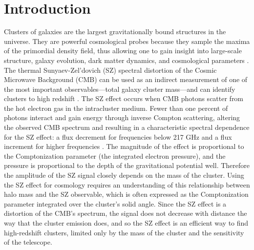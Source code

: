\documentclass[a4paper,fleqn,usenatbib]{mnras}
\begin{document}
\begin{keywords}

\end{keywords}




\section{Introduction}
Clusters of galaxies are the largest gravitationally bound structures in the universe. 
They are powerful cosmological probes because they sample the maxima of the primordial density field, thus allowing one to gain insight into large-scale structure, galaxy evolution, dark matter dynamics, and cosmological parameters \citep{2005RvMP...77..207V,2013SSRv..177..247G}. 
The thermal Sunyaev-Zel'dovich (SZ) spectral distortion of the Cosmic Microwave Background (CMB) \citep{1972CoASP...4..173S} can be used as an indirect measurement of one of the most important observables---total galaxy cluster mass---and can identify clusters to high redshift \citep{2002ARA&A..40..643C}. 
The SZ effect occurs when CMB photons scatter from the hot electron gas in the intracluster medium. 
Fewer than one percent of photons interact and gain energy through inverse Compton scattering, altering the observed CMB spectrum and resulting in a characteristic spectral dependence for the SZ effect: a flux decrement for frequencies below 217 GHz and a flux increment for higher frequencies \citep{1999PhR...310...97B,2002ARA&A..40..643C}.
The magnitude of the effect is proportional to the Comptonization parameter (the integrated electron pressure), and the pressure is proportional to the depth of the gravitational potential well.  Therefore the amplitude of the SZ signal closely depends on the mass of the cluster.
Using the SZ effect for cosmology requires an understanding of this relationship between halo mass and the SZ observable, which is often expressed as the Comptonization parameter integrated over the cluster's solid angle. 
Since the SZ effect is a distortion of the CMB's spectrum, the signal does not decrease with distance the way that the cluster emission does, and so the SZ effect is an efficient way to find high-redshift clusters, limited only by the mass of the cluster and the sensitivity of the telescope.
\end{document}
